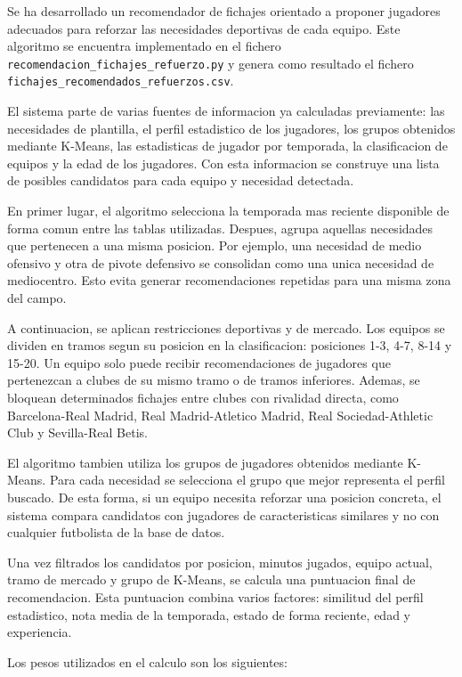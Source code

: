 Se ha desarrollado un recomendador de fichajes orientado a proponer jugadores adecuados para reforzar las necesidades deportivas de cada equipo. Este algoritmo se encuentra implementado en el fichero \texttt{recomendacion\_fichajes\_refuerzo.py} y genera como resultado el fichero \texttt{fichajes\_recomendados\_refuerzos.csv}.

El sistema parte de varias fuentes de informacion ya calculadas previamente: las necesidades de plantilla, el perfil estadistico de los jugadores, los grupos obtenidos mediante K-Means, las estadisticas de jugador por temporada, la clasificacion de equipos y la edad de los jugadores. Con esta informacion se construye una lista de posibles candidatos para cada equipo y necesidad detectada.

En primer lugar, el algoritmo selecciona la temporada mas reciente disponible de forma comun entre las tablas utilizadas. Despues, agrupa aquellas necesidades que pertenecen a una misma posicion. Por ejemplo, una necesidad de medio ofensivo y otra de pivote defensivo se consolidan como una unica necesidad de mediocentro. Esto evita generar recomendaciones repetidas para una misma zona del campo.

A continuacion, se aplican restricciones deportivas y de mercado. Los equipos se dividen en tramos segun su posicion en la clasificacion: posiciones 1-3, 4-7, 8-14 y 15-20. Un equipo solo puede recibir recomendaciones de jugadores que pertenezcan a clubes de su mismo tramo o de tramos inferiores. Ademas, se bloquean determinados fichajes entre clubes con rivalidad directa, como Barcelona-Real Madrid, Real Madrid-Atletico Madrid, Real Sociedad-Athletic Club y Sevilla-Real Betis.

El algoritmo tambien utiliza los grupos de jugadores obtenidos mediante K-Means. Para cada necesidad se selecciona el grupo que mejor representa el perfil buscado. De esta forma, si un equipo necesita reforzar una posicion concreta, el sistema compara candidatos con jugadores de caracteristicas similares y no con cualquier futbolista de la base de datos.

Una vez filtrados los candidatos por posicion, minutos jugados, equipo actual, tramo de mercado y grupo de K-Means, se calcula una puntuacion final de recomendacion. Esta puntuacion combina varios factores: similitud del perfil estadistico, nota media de la temporada, estado de forma reciente, edad y experiencia.

Los pesos utilizados en el calculo son los siguientes:

